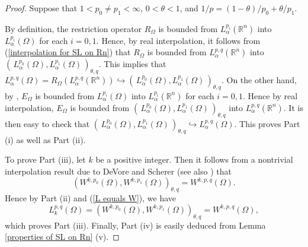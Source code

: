 \documentclass[reqno,centertags,11pt]{amsart}
\theoremstyle{definition}
\numberwithin{thm}{section}
\numberwithin{equation}{section}
\newcommand{\R}{{\mathbb{R}}}
\begin{document}
\begin{proof}
Suppose that  $1< p_0 \neq p_1 < \infty$, $0<\theta < 1$, and $1/p=(1-\theta)/p_0 +\theta/p_1$.

By definition,  the restriction operator  $R_\Omega$ is bounded from $L_\alpha^{p_i}(\R^n  )$ into  $L_\alpha^{p_i}(\Omega )$   for each $i=0,1$. Hence, by real interpolation,   it follows from (\ref{interpolation for SL on Rn}) that $R_\Omega$ is bounded from $ L_\alpha^{p,q}(\R^n )$ into $\left(\,  L_\alpha^{p_0}(\Omega ) , L_\alpha^{p_1}(\Omega ) \, \right)_{\theta,q}$. This implies that $ L_\alpha^{p,q}(\Omega  ) = R_\Omega  ( L_\alpha^{p,q}(\R^n ) ) \hookrightarrow \left(\,  L_\alpha^{p_0}(\Omega ) , L_\alpha^{p_1}(\Omega ) \, \right)_{\theta,q}$. On the other hand, by  \cite[Proposition 2.4]{JK},  $E_\Omega$ is bounded from $L_\alpha^{p_i}(\Omega )$ into $L_\alpha^{p_i}(\R^n  )$ for each $i=0,1$. Hence by real interpolation, $E_\Omega$ is bounded from $\left(\,  L_\alpha^{p_0}(\Omega ) , L_\alpha^{p_1}(\Omega ) \, \right)_{\theta,q}$ into $ L_\alpha^{p,q}(\R^n )$.
It is then easy to check that $\left(\,  L_\alpha^{p_0}(\Omega ) , L_\alpha^{p_1}(\Omega ) \, \right)_{\theta,q} \hookrightarrow    L_\alpha^{p,q}(\Omega  )$.  This proves  Part (i) as well  as  Part (ii).

To prove Part (iii), let $k$ be a positive integer. Then it follows from a nontrivial
interpolation result due to DeVore and Scherer   \cite[Theorem 2]{DS} (see also \cite[Lemma 2.6]{KO}) that
\[
\left(W^{k,p_0}(\Omega ), W^{k,p_1}(\Omega ) \right)_{\theta,q} = W^{k,p,q}(\Omega ).
\]
Hence by   Part (ii) and (\ref{L equals W}), we have
\[
L_k^{p,q}(\Omega ) = \left(W^{k,p_0}(\Omega ), W^{k,p_1}(\Omega ) \right)_{\theta,q} = W^{k,p,q}(\Omega ),
\]
which proves Part (iii).
Finally, Part  (iv) is easily deduced from  Lemma \ref{properties of SL on Rn}  (v).
\end{proof}
\end{document}
